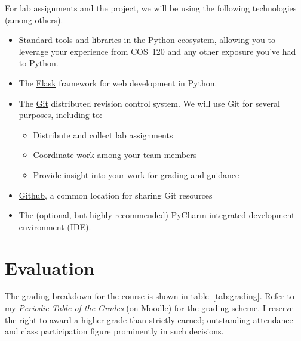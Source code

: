\documentclass[11pt]{article}
\begin{document}
For lab assignments and the project,
we will be using the following technologies (among others).
\begin{itemize}
\item Standard tools and libraries in the Python ecosystem,
  allowing you to leverage your experience
  from COS~120 and any other exposure you've had to Python.
\item The \href{http://flask.pocoo.org/}{Flask}
  framework for web development in Python.
\item The \href{https://git-scm.com/}{Git}
  distributed revision control system.
  We will use Git
  for several purposes, including to:
  \begin{itemize}
  \item Distribute and collect lab assignments
  \item Coordinate work among your team members
  \item Provide insight into your work for grading and guidance
  \end{itemize}
\item \href{https://github.com/}{Github},
  a common location for sharing Git resources
\item The (optional, but highly recommended)
  \href{https://www.jetbrains.com/pycharm/}{PyCharm}
  integrated development environment (IDE).
\end{itemize}

\section{Evaluation}

The grading breakdown for the course
is shown in table~\ref{tab:grading}.
Refer to my \emph{Periodic Table of the Grades} (on Moodle)
for the grading scheme.
I reserve the right to award a higher grade than strictly earned;
outstanding attendance and class participation
figure prominently in such decisions.
\end{document}
